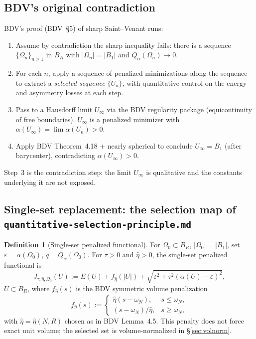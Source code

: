 \documentclass[11pt]{article}
\theoremstyle{definition}
\newtheorem{definition}[theorem]{Definition}
\newcommand{\abs}[1]{\left|#1\right|}
\begin{document}
\subsection{BDV's original contradiction}

BDV's proof (BDV~\S 5) of sharp Saint--Venant runs:
\begin{enumerate}
\item Assume by contradiction the sharp inequality fails: there is a
sequence $\{\Omega_n\}_{n\ge1}$ in $B_R$ with $\abs{\Omega_n}=\abs{B_1}$ and
\(Q_\alpha(\Omega_n)\to 0\).
\item For each $n$, apply a sequence of penalized minimizations along the
sequence to extract a \emph{selected sequence} $\{U_n\}$, with quantitative
control on the energy and asymmetry losses at each step.
\item Pass to a Hausdorff limit $U_\infty$ via the BDV regularity package
(equicontinuity of free boundaries). $U_\infty$ is a penalized minimizer
with $\alpha(U_\infty)=\lim\alpha(U_n)>0$.
\item Apply BDV Theorem~4.18 + nearly spherical to conclude $U_\infty=B_1$
(after barycenter), contradicting $\alpha(U_\infty)>0$.
\end{enumerate}

Step~3 is the contradiction step: the limit $U_\infty$ is qualitative and
the constants underlying it are not exposed.

\subsection{Single-set replacement: the selection map of
\texttt{quantitative-selection-principle.md}}

\begin{definition}[Single-set penalized functional]\label{def:penal}
For $\Omega_0\subset B_R$, $\abs{\Omega_0}=\abs{B_1}$, set
$\varepsilon=\alpha(\Omega_0)$, $q=Q_\alpha(\Omega_0)$. For
$\tau>0$ and $\hat\eta>0$, the single-set penalized functional is
\[
J_{\tau,\hat\eta,\Omega_0}(U)
:=E(U)+f_{\hat\eta}(\abs U)
+\sqrt{\varepsilon^2+\tau^2(\alpha(U)-\varepsilon)^2},
\]
$U\subset B_R$, where $f_{\hat\eta}(s)$ is the BDV symmetric volume
penalization
\[
f_{\hat\eta}(s):=
\begin{cases}
\hat\eta(s-\omega_N),&s\le\omega_N,\\
(s-\omega_N)/\hat\eta,&s\ge\omega_N,
\end{cases}
\]
with $\hat\eta=\hat\eta(N,R)$ chosen as in BDV Lemma~4.5. This penalty does
not force exact unit volume; the selected set is volume-normalized in
\S\ref{sec:volnorm}.
\end{definition}
\end{document}
